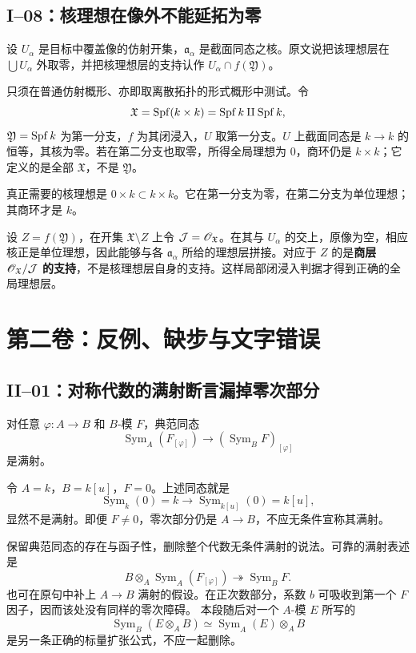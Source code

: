 \section{I--08：核理想在像外不能延拓为零}
设 $U_\alpha$ 是目标中覆盖像的仿射开集，$\mathfrak a_\alpha$ 是截面同态之核。原文说把该理想层在 $\bigcup U_\alpha$ 外取零，并把核理想层的支持认作 $U_\alpha\cap f(\mathfrak Y)$。
\begin{analysisproof}
只须在普通仿射概形、亦即取离散拓扑的形式概形中测试。令
\[
\mathfrak X=\operatorname{Spf}(k\times k)=\operatorname{Spf} k\amalg\operatorname{Spf} k,
\]
$\mathfrak Y=\operatorname{Spf} k$ 为第一分支，$f$ 为其闭浸入，$U$ 取第一分支。$U$ 上截面同态是 $k\to k$ 的恒等，其核为零。若在第二分支也取零，所得全局理想为 $0$，商环仍是 $k\times k$；它定义的是全部 $\mathfrak X$，不是 $\mathfrak Y$。

真正需要的核理想是 $0\times k\subset k\times k$。它在第一分支为零，在第二分支为单位理想；其商环才是 $k$。
\end{analysisproof}
设 $Z=f(\mathfrak Y)$，在开集 $\mathfrak X\setminus Z$ 上令 $\mathcal J=\mathscr O_{\mathfrak X}$。在其与 $U_\alpha$ 的交上，原像为空，相应核正是单位理想，因此能够与各 $\mathfrak a_\alpha$ 所给的理想层拼接。对应于 $Z$ 的是\textbf{商层 $\mathscr O_{\mathfrak X}/\mathcal J$ 的支持}，不是核理想层自身的支持。这样局部闭浸入判据才得到正确的全局理想层。

\chapter{第二卷：反例、缺步与文字错误}
\section{II--01：对称代数的满射断言漏掉零次部分}
对任意 $\varphi:A\to B$ 和 $B$-模 $F$，典范同态
\[
\operatorname{Sym}_A(F_{[\varphi]})\longrightarrow(\operatorname{Sym}_BF)_{[\varphi]}
\]
是满射。
\begin{analysisproof}
令 $A=k$，$B=k[u]$，$F=0$。上述同态就是
\[
\operatorname{Sym}_k(0)=k\longrightarrow\operatorname{Sym}_{k[u]}(0)=k[u],
\]
显然不是满射。即便 $F\ne0$，零次部分仍是 $A\to B$，不应无条件宣称其满射。
\end{analysisproof}
保留典范同态的存在与函子性，删除整个代数无条件满射的说法。可靠的满射表述是
\[
B\otimes_A\operatorname{Sym}_A(F_{[\varphi]})\twoheadrightarrow\operatorname{Sym}_BF.
\]
也可在原句中补上 $A\to B$ 满射的假设。在正次数部分，系数 $b$ 可吸收到第一个 $F$ 因子，因而该处没有同样的零次障碍。
本段随后对一个 $A$-模 $E$ 所写的
\[
\operatorname{Sym}_B(E\otimes_AB)\simeq\operatorname{Sym}_A(E)\otimes_AB
\]
是另一条正确的标量扩张公式，不应一起删除。

